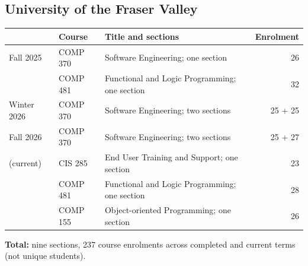\documentclass[10pt,letterpaper]{article}
\newcommand{\cvtablehead}[1]{{\color{mbblue}\sffamily\bfseries #1}}
\newenvironment{cvtable}{%
 \begingroup\fontsize{9.2}{11.3}\selectfont
 \setlength{\tabcolsep}{5pt}\renewcommand{\arraystretch}{1.16}
%
}{\par\endgroup}
\begin{document}
\subsection{University of the Fraser Valley}
\begin{cvtable}
\begin{tabularx}{\textwidth}{@{}>{\raggedright\arraybackslash}p{1.85cm}>{\raggedright\arraybackslash}p{1.85cm}>{\raggedright\arraybackslash}Xr@{}}
\toprule
\cvtablehead{Term} & \cvtablehead{Course} & \cvtablehead{Title and sections} & \cvtablehead{Enrolment}\\\midrule
Fall 2025 & COMP 370 & Software Engineering; one section & 26\\
& COMP 481 & Functional and Logic Programming; one section & 32\\\addlinespace[3pt]
Winter 2026 & COMP 370 & Software Engineering; two sections & 25 + 25\\\addlinespace[3pt]
Fall 2026 & COMP 370 & Software Engineering; two sections & 25 + 27\\
(current) & CIS 285 & End User Training and Support; one section & 23\\
& COMP 481 & Functional and Logic Programming; one section & 28\\
& COMP 155 & Object-oriented Programming; one section & 26\\\bottomrule
\end{tabularx}
\end{cvtable}
\vspace{3pt}
\textbf{Total:} nine sections, 237 course enrolments across completed and current terms (not unique students).
\end{document}
